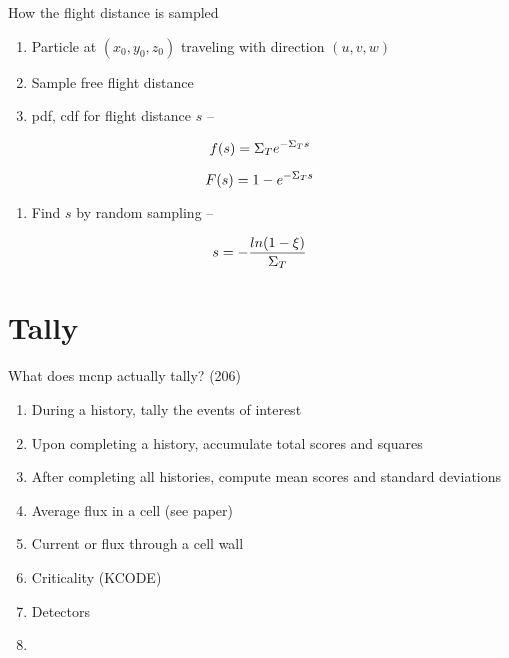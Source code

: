 \documentclass[aspectratio=1610,pdftex,dvipsnames,compress,xcolor={dvipsnames}]{beamer}
\newcommand{\acsp}{\acrshortpl} %
\begin{document}
\begin{frame}{How the flight distance is sampled}
    \begin{enumerate}[series=outerlist,topsep=0pt,itemsep=21pt,leftmargin=*,label=(\arabic*)]
        \item[]Particle at $(x_0,y_0,z_0)$ traveling with direction $(u,v,w)$
        \item[]Sample free flight distance
        \item[]pdf, cdf for flight distance $s$ --
    \end{enumerate}

    \vspace*{\fill}

    \begin{equation}
        \LARGE
        f(s) = \Sigma_T e^{-\Sigma_T s}
    \end{equation}

    \begin{equation}
        \LARGE
        F(s) = 1 - e^{-\Sigma_T s}
    \end{equation}

    \vspace*{\fill}

    \begin{enumerate}[series=outerlist,topsep=0pt,itemsep=21pt,leftmargin=*,label=(\arabic*)]
        \item[]Find $s$ by random sampling --
    \end{enumerate}

    \vspace*{\fill}

    \begin{equation}
        \LARGE
        s = -\frac{ln(1 - \xi)}{\Sigma_T}
    \end{equation}
\end{frame}


\section{Tally}


\addtocounter{framenumber}{-1} 
\begin{frame}{What does mcnp actually tally? (206)}
    \begin{enumerate}[series=outerlist,topsep=0pt,itemsep=17pt,leftmargin=*,label=(\arabic*)]
        \item[]During a history, tally the events of interest
        \item[]Upon completing a history, accumulate total scores and squares
        \item[]After completing all histories, compute mean scores and standard deviations
        \item[]Average flux in a cell (see paper)
        \item[]Current or flux through a cell wall
        \item[]Criticality (KCODE)
        \item[]Detectors
        \item[]\acsp{rtg}
    \end{enumerate}
\end{frame}
\end{document}
